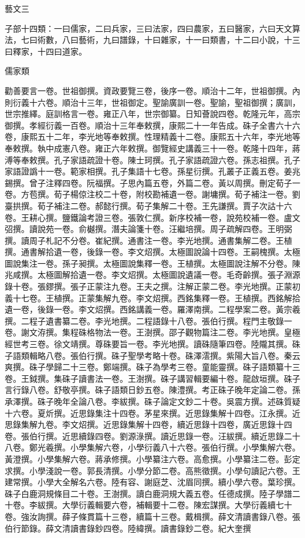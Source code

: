 
\begin{pinyinscope}
藝文三

子部十四類：一曰儒家，二曰兵家，三曰法家，四曰農家，五曰醫家，六曰天文算法，七曰術數，八曰藝術，九曰譜錄，十曰雜家，十一曰類書，十二曰小說，十三曰釋家，十四曰道家。

儒家類

勸善要言一卷。世祖御撰。資政要覽三卷，後序一卷。順治十二年，世祖御撰。內則衍義十六卷。順治十三年，世祖御定。聖諭廣訓一卷。聖諭，聖祖御撰；廣訓，世宗推繹。庭訓格言一卷。雍正八年，世宗御纂。日知薈說四卷。乾隆元年，高宗御撰。孝經衍義一百卷。順治十三年奉敕撰，康熙二十一年告成。硃子全書六十六卷，康熙五十二年，李光地等奉敕撰。性理精義十二卷。康熙五十六年，李光地等奉敕撰。執中成憲八卷。雍正六年敕撰。御覽經史講義三十一卷。乾隆十四年，蔣溥等奉敕撰。孔子家語疏證十卷。陳士珂撰。孔子家語疏證六卷。孫志祖撰。孔子家語證譌十一卷。範家相撰。孔子集語十七卷。孫星衍撰。孔叢子正義五卷。姜兆錫撰。曾子注釋四卷。阮福撰。子思內篇五卷，外篇二卷。黃以周撰。刪定荀子一卷。方苞撰。荀子楊倞注校二十卷，附校勘補遺一卷。謝墉撰。荀子補注一卷。劉臺拱撰。荀子補注二卷。郝懿行撰。荀子集解二十卷。王先謙撰。賈子次詁十六卷。王耕心撰。鹽鐵論考證三卷。張敦仁撰。新序校補一卷，說苑校補一卷。盧文弨撰。讀說苑一卷。俞樾撰。潛夫論箋十卷。汪繼培撰。周子疏解四卷。王明弼撰。讀周子札記不分卷。崔紀撰。通書注一卷。李光地撰。通書集解二卷。王植撰。通書解拾遺一卷，後錄一卷。李文炤撰。太極圖說論十四卷。王嗣槐撰。太極圖說集注一卷。孫子昶撰。太極圖說集釋一卷。王植撰。太極圖說注解不分卷。陳兆咸撰。太極圖解拾遺一卷。李文炤撰。太極圖說遺議一卷。毛奇齡撰。張子淵源錄十卷。張鏐撰。張子正蒙注九卷。王夫之撰。注解正蒙二卷。李光地撰。正蒙初義十七卷。王植撰。正蒙集解九卷。李文炤撰。西銘集釋一卷。王植撰。西銘解拾遺一卷，後錄一卷。李文炤撰。西銘講義一卷。羅澤南撰。二程學案二卷。黃宗羲撰。二程子遺書纂二卷。李光地撰。二程語錄十八卷。張伯行撰。程門主敬錄一卷。謝文洊撰。集程硃格物法一卷。王澍撰。邵子觀物篇注二卷。李光地撰。皇極經世考三卷。徐文靖撰。尊硃要旨一卷。李光地撰。讀硃隨筆四卷。陸隴其撰。硃子語類輯略八卷。張伯行撰。硃子聖學考略十卷。硃澤澐撰。紫陽大旨八卷。秦云爽撰。硃子學歸二十三卷。鄭端撰。硃子為學考三卷。童能靈撰。硃子語類纂十三卷。王鉞撰。集硃子讀書法一卷。王澍撰。硃子講習輯要編十卷。龍啟垣撰。硃子言行錄八卷。舒敬亭撰。硃子語類日鈔五卷。陳澧撰。考正硃子晚年定論二卷。孫承澤撰。硃子晚年全論八卷。李紱撰。硃子論定文鈔二十卷。吳震方撰。述硃質疑十六卷。夏炘撰。近思錄集注十四卷。茅星來撰。近思錄集解十四卷。江永撰。近思錄集解九卷。李文炤撰。近思錄集解十四卷，續近思錄十四卷，廣近思錄十四卷。張伯行撰。近思續錄四卷。劉源淥撰。讀近思錄一卷。汪紱撰。續近思錄二十八卷。鄭光羲撰。小學集解六卷，小學衍義八十六卷。張伯行撰。小學集解六卷。黃澄撰。小學集解六卷。蔣承修撰。小學纂注六卷。高愈撰。小學纂注二卷。彭定求撰。小學淺說一卷。郭長清撰。小學分節二卷。高熊徵撰。小學句讀記六卷。王建常撰。小學大全解名六卷。陸有容、謝庭芝、沈眉同撰。續小學六卷。葉珍撰。硃子白鹿洞規條目二十卷。王澍撰。讀白鹿洞規大義五卷。任德成撰。陸子學譜二十卷。李紱撰。大學衍義輯要六卷，補輯要十二卷。陳宏謀撰。大學衍義續七十卷。強汝詢撰。薛子條貫篇十三卷，續篇十三卷。戴楫撰。薛文清讀書錄八卷。張伯行節錄。薛文清讀書錄鈔四卷。陸緯撰。讀書錄鈔二卷。紀大奎撰
\end{pinyinscope}
